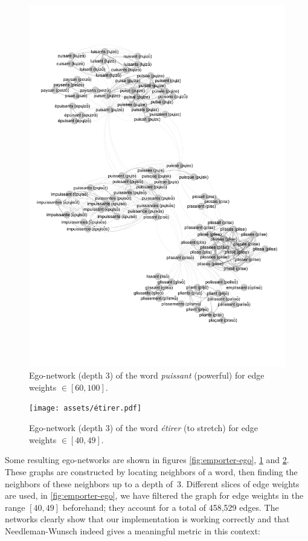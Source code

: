 \begin{figure}[H]
    \centering
    \includegraphics[width=\linewidth, trim=1cm 3.4cm 0.5cm 3.2cm, clip]{assets/puissant-ego.pdf}
    \caption{Ego-network (depth 3) of the word \textit{puissant} (powerful) for edge weights $\in [60, 100]$.}
    \label{fig:puissant-ego}
\end{figure}

\begin{figure}[H]
    \centering
    \texttt{[image: assets/étirer.pdf]}
    \caption{Ego-network (depth 3) of the word \textit{étirer} (to stretch) for edge weights $\in [40,49]$.}
    \label{fig:etirer-ego}
\end{figure}

Some resulting ego-networks are shown in figures \ref{fig:emporter-ego}, \ref{fig:puissant-ego} and \ref{fig:etirer-ego}. These graphs are constructed by locating neighbors of a word, then finding the neighbors of these neighbors up to a depth of~3. Different slices of edge weights are used, \eg in \autoref{fig:emporter-ego}, we have filtered the graph for edge weights in the range $[40,49]$ beforehand; they account for a total of 458,529 edges. The networks clearly show that our implementation is working correctly and that Needleman-Wunsch indeed gives a meaningful metric in this context:

